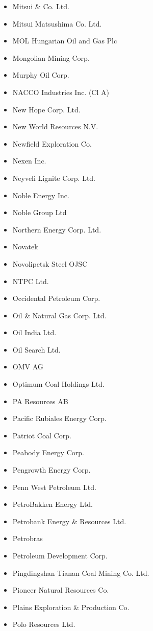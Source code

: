 \begin{itemize}
  \item Mitsui \& Co. Ltd.
  \item Mitsui Matsushima Co. Ltd.
  \item MOL Hungarian Oil and Gas Plc
  \item Mongolian Mining Corp.
  \item Murphy Oil Corp.
  \item NACCO Industries Inc. (Cl A)
  \item New Hope Corp. Ltd.
  \item New World Resources N.V.
  \item Newfield Exploration Co.
  \item Nexen Inc.
  \item Neyveli Lignite Corp. Ltd.
  \item Noble Energy Inc.
  \item Noble Group Ltd
  \item Northern Energy Corp. Ltd.
  \item Novatek
  \item Novolipetsk Steel OJSC
  \item NTPC Ltd.
  \item Occidental Petroleum Corp.
  \item Oil \& Natural Gas Corp. Ltd.
  \item Oil India Ltd.
  \item Oil Search Ltd.
  \item OMV AG
  \item Optimum Coal Holdings Ltd.
  \item PA Resources AB
  \item Pacific Rubiales Energy Corp.
  \item Patriot Coal Corp.
  \item Peabody Energy Corp.
  \item Pengrowth Energy Corp.
  \item Penn West Petroleum Ltd.
  \item PetroBakken Energy Ltd.
  \item Petrobank Energy \& Resources Ltd.
  \item Petrobras
  \item Petroleum Development Corp.
  \item Pingdingshan Tianan Coal Mining Co. Ltd.
  \item Pioneer Natural Resources Co.
  \item Plains Exploration \& Production Co.
  \item Polo Resources Ltd.

\end{itemize}
